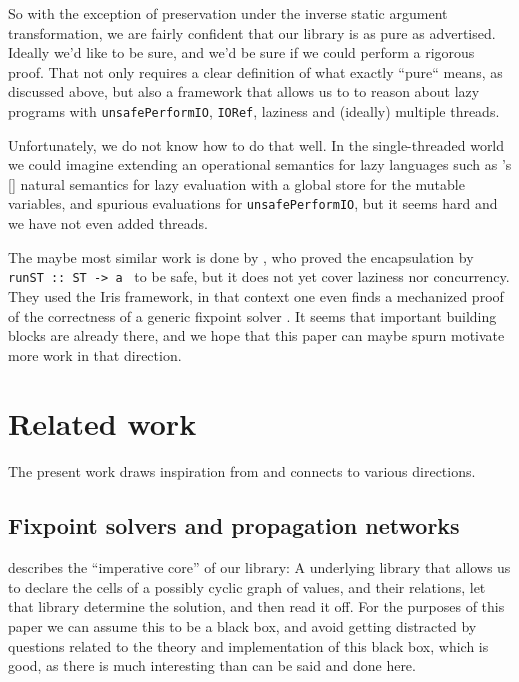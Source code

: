 \documentclass[manuscript,screen,acmsmall]{acmart}
\begin{document}
So with the exception of preservation under the inverse static argument transformation, we are fairly confident that our library is as pure as advertised. Ideally we'd like to be sure, and we’d be sure if we could perform a rigorous proof.  That not only requires a clear definition of what exactly “pure“ means, as discussed above, but also a framework that allows us to to reason about lazy programs with \verb|unsafePerformIO|, \verb|IORef|, laziness and (ideally) multiple threads.

Unfortunately, we do not know how to do that well. In the single-threaded world we could imagine extending an operational semantics for lazy languages such as \citeauthor{launchbury}’s [\citeyear{launchbury}] natural semantics for lazy evaluation with a global store for the mutable variables, and spurious evaluations for \verb|unsafePerformIO|, but it seems hard and we have not even added threads.

The maybe most similar work is done  by \citet{runST}, who proved the encapsulation by \verb|runST :: ST -> a | to be safe, but it does not yet cover laziness nor concurrency.
They used the Iris framework, in that context one even finds a mechanized proof of the correctness of a generic fixpoint solver \citep{spygame}.
It seems that important building blocks are already there, and we hope that this paper can maybe spurn motivate more work in that direction.


\section{Related work}\label{sec:related}

The present work draws inspiration from and connects to various directions.

\subsection{Fixpoint solvers and propagation networks}

 describes the “imperative core” of our library: A underlying library that allows us to declare the cells of a possibly cyclic graph of values, and their relations, let that library determine the solution, and then read it off. For the purposes of this paper we can assume this to be a black box, and avoid getting distracted by questions related to the theory and implementation of this black box, which is good, as there is much interesting than can be said and done here.
\end{document}
